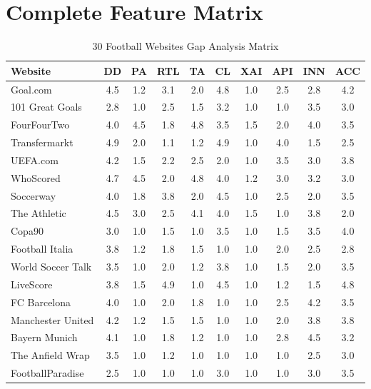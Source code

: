 \section{Complete Feature Matrix}
\begin{table}[h!]
    \centering
    \caption{30 Football Websites Gap Analysis Matrix}
    \label{tab:feature-matrix}
    \tiny
    \begin{tabular}{|l|c|c|c|c|c|c|c|c|c|}
        \hline
        \textbf{Website} & \textbf{DD} & \textbf{PA} & \textbf{RTL} & \textbf{TA} & \textbf{CL} & \textbf{XAI} & \textbf{API} & \textbf{INN} & \textbf{ACC} \\
        \hline
        Goal.com & 4.5 & 1.2 & 3.1 & 2.0 & 4.8 & 1.0 & 2.5 & 2.8 & 4.2 \\
        101 Great Goals & 2.8 & 1.0 & 2.5 & 1.5 & 3.2 & 1.0 & 1.0 & 3.5 & 3.0 \\
        FourFourTwo & 4.0 & 4.5 & 1.8 & 4.8 & 3.5 & 1.5 & 2.0 & 4.0 & 3.5 \\
        Transfermarkt & 4.9 & 2.0 & 1.1 & 1.2 & 4.9 & 1.0 & 4.0 & 1.5 & 2.5 \\
        UEFA.com & 4.2 & 1.5 & 2.2 & 2.5 & 2.0 & 1.0 & 3.5 & 3.0 & 3.8 \\
        WhoScored & 4.7 & 4.5 & 2.0 & 4.8 & 4.0 & 1.2 & 3.0 & 3.2 & 3.0 \\
        Soccerway & 4.0 & 1.8 & 3.8 & 2.0 & 4.5 & 1.0 & 2.5 & 2.0 & 3.5 \\
        The Athletic & 4.5 & 3.0 & 2.5 & 4.1 & 4.0 & 1.5 & 1.0 & 3.8 & 2.0 \\
        Copa90 & 3.0 & 1.0 & 1.5 & 1.0 & 3.5 & 1.0 & 1.5 & 3.5 & 4.0 \\
        Football Italia & 3.8 & 1.2 & 1.8 & 1.5 & 1.0 & 1.0 & 2.0 & 2.5 & 2.8 \\
        World Soccer Talk & 3.5 & 1.0 & 2.0 & 1.2 & 3.8 & 1.0 & 1.5 & 2.0 & 3.5 \\
        LiveScore & 3.8 & 1.5 & 4.9 & 1.0 & 4.5 & 1.0 & 1.2 & 1.5 & 4.8 \\
        FC Barcelona & 4.0 & 1.0 & 2.0 & 1.8 & 1.0 & 1.0 & 2.5 & 4.2 & 3.5 \\
        Manchester United & 4.2 & 1.2 & 1.5 & 1.5 & 1.0 & 1.0 & 2.0 & 3.8 & 3.8 \\
        Bayern Munich & 4.1 & 1.0 & 1.8 & 1.2 & 1.0 & 1.0 & 2.8 & 4.5 & 3.2 \\
        The Anfield Wrap & 3.5 & 1.0 & 1.2 & 1.0 & 1.0 & 1.0 & 1.0 & 2.5 & 3.0 \\
        FootballParadise & 2.5 & 1.0 & 1.0 & 1.0 & 3.0 & 1.0 & 1.0 & 3.0 & 3.5 \\

\end{tabular}
\end{table}
